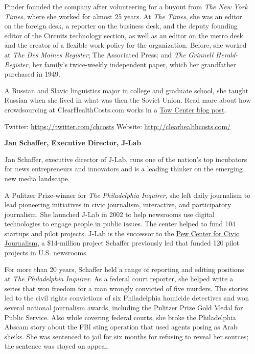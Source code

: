 \documentclass[notoc, symmetric, nobib, nols]{towcenter-guideto-book}
\begin{document}
Pinder founded the company after volunteering for a buyout from \textit{The New York Times}, where she worked for almost 25 years. At \textit{The Times}, she was an editor on the foreign desk, a reporter on the business desk, and the deputy founding editor of the Circuits technology section, as well as an editor on the metro desk and the creator of a flexible work policy for the organization. Before, she worked at \textit{The Des Moines Register}; The Associated Press; and \textit{The Grinnell Herald-Register}, her family's twice-weekly independent paper, which her grandfather purchased in 1949.

A Russian and Slavic linguistics major in college and graduate school, she taught Russian when she lived in what was then the Soviet Union. Read more about how crowdsourcing at ClearHealthCosts.com works in a \href{http://towcenter.org/crowdsourcing-in-theory-and-practice}{Tow Center blog post}.%

Twitter: \href{https://twitter.com/chcosts}{https://twitter.com/chcosts}
Website: \href{http://clearhealthcosts.com/}{http://clearhealthcosts.com/}


\textbf{Jan Schaffer, Executive Director, J-Lab}

Jan Schaffer, executive director of J-Lab, runs one of the nation's top incubators for news entrepreneurs and innovators and is a leading thinker on the emerging new media landscape.

A Pulitzer Prize-winner for \textit{The Philadelphia Inquirer}, she left daily journalism to lead pioneering initiatives in civic journalism, interactive, and participatory journalism. She launched J-Lab in 2002 to help newsrooms use digital technologies to engage people in public issues. The center helped to fund 104 startups and pilot projects. J-Lab is the successor to the \href{http://pewcenter.org/}{Pew Center for Civic Journalism}, a \$14-million project Schaffer previously led that funded 120 pilot projects in U.S. newsrooms. 

For more than 20 years, Schaffer held a range of reporting and editing positions at \textit{The Philadelphia Inquirer}. As a federal court reporter, she helped write a series that won freedom for a man wrongly convicted of five murders. The stories led to the civil rights convictions of six Philadelphia homicide detectives and won several national journalism awards, including the Pulitzer Prize Gold Medal for Public Service. Also while covering federal courts, she broke the Philadelphia Abscam story about the FBI sting operation that used agents posing as Arab sheiks. She was sentenced to jail for six months for refusing to reveal her sources; the sentence was stayed on appeal.
\end{document}
